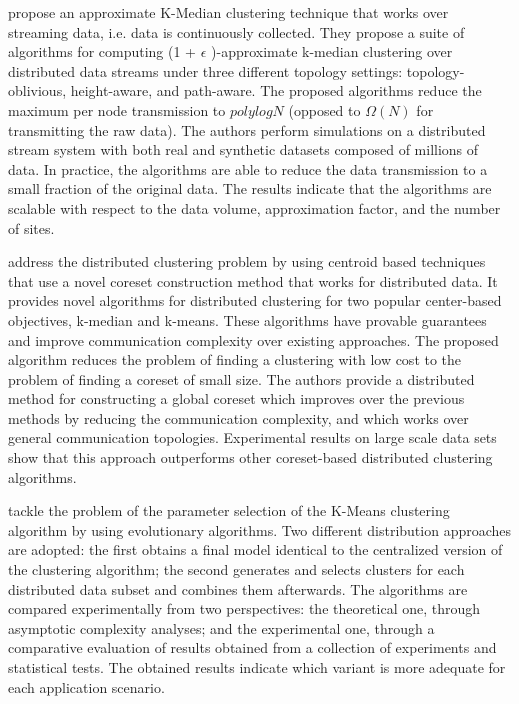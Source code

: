 \documentclass[a4paper]{article}
\begin{document}
\cite{ZLW08} propose an approximate K-Median clustering technique that works over streaming data, i.e. data is continuously collected. They propose a suite of algorithms for computing (1 + $\epsilon$ )-approximate k-median clustering over distributed data streams under three different topology settings: topology-oblivious, height-aware, and path-aware. The proposed algorithms reduce the maximum per node transmission to $polylog N$ (opposed to $\Omega(N)$ for transmitting the raw data). The authors perform simulations on a distributed stream system with both real and synthetic datasets composed of millions of data. In practice, the algorithms are able to reduce the data transmission to a small fraction of the original data. The results indicate that the algorithms are scalable with respect to the data volume, approximation factor, and the number of sites.

\cite{BEL13} address the distributed clustering problem by using centroid based techniques that use a novel coreset construction method that works for distributed data. It provides novel algorithms for distributed clustering for two popular center-based objectives, k-median and k-means. These algorithms have provable guarantees and improve communication complexity over existing approaches. The proposed algorithm reduces the problem of finding a clustering with low cost to the problem of finding a coreset of small size. The authors provide a distributed method for constructing a global coreset which improves over the previous methods by reducing the communication complexity, and which works over general communication topologies. Experimental results on large scale data sets show that this approach outperforms other coreset-based distributed clustering algorithms.

\cite{NC14} tackle the problem of the parameter selection of the K-Means clustering algorithm by using evolutionary algorithms. Two different distribution approaches are adopted: the first obtains a final model identical to the centralized version of the clustering algorithm; the second generates and selects clusters for each distributed data subset and combines them afterwards. The algorithms are compared experimentally from two perspectives: the theoretical one, through asymptotic complexity analyses; and the experimental one, through a comparative evaluation of results obtained from a collection of experiments and statistical tests. The obtained results indicate which variant is more adequate for each application scenario.
\end{document}
